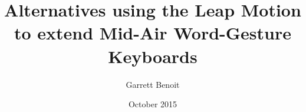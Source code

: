 \documentclass
[
]
{thesis}
\title{Alternatives using the Leap Motion to extend Mid-Air Word-Gesture Keyboards}
\author{Garrett Benoit}
\date{October 2015}
\begin{document}
	
	
	
	
	
	
	
	
	\thesisAppendixPage 
	\begin{appendices}
		
		
	\end{appendices}
	
	
	
\end{document}
